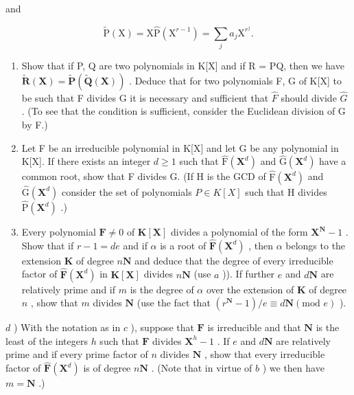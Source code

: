 and

\[
\tilde {\mathrm{P}} (\mathrm{X}) = \mathrm{X} \hat {\mathrm{P}} \left(\mathrm{X} ^ {r - 1}\right) = \sum_ {j} a _ {j} \mathrm{X} ^ {r ^ {j}}.
\]

\begin{enumerate}
\def\labelenumi{\alph{enumi})}
\item
  Show that if P, Q are two polynomials in K{[}X{]} and if R = PQ, then we have \(\tilde{\mathbf{R}}(\mathbf{X}) = \tilde{\mathbf{P}}(\tilde{\mathbf{Q}}(\mathbf{X}))\) . Deduce that for two polynomials F, G of K{[}X{]} to be such that F divides G it is necessary and sufficient that \(\hat{F}\) should divide \(\hat{G}\) . (To see that the condition is sufficient, consider the Euclidean division of G by F.)
\item
  Let F be an irreducible polynomial in K{[}X{]} and let G be any polynomial in K{[}X{]}. If there exists an integer \(d \geqslant 1\) such that \(\hat{\mathrm{F}}(\mathbf{X}^{d})\) and \(\hat{\mathrm{G}}(\mathbf{X}^{d})\) have a common root, show that F divides G. (If H is the GCD of \(\hat{\mathrm{F}}(\mathbf{X}^{d})\) and \(\hat{\mathrm{G}}(\mathbf{X}^{d})\) consider the set of polynomials \(P \in K[X]\) such that H divides \(\hat{\mathrm{P}}(\mathbf{X}^{d})\) .)
\item
  Every polynomial \(\mathbf{F} \neq 0\) of \(\mathbf{K}[\mathbf{X}]\) divides a polynomial of the form \(\mathbf{X}^{\mathbf{N}} - 1\) . Show that if \(r - 1 = de\) and if \(\alpha\) is a root of \(\hat{\mathbf{F}}(\mathbf{X}^{d})\) , then \(\alpha\) belongs to the extension \(\mathbf{K}\) of degree \(n\mathbf{N}\) and deduce that the degree of every irreducible factor of \(\hat{\mathbf{F}}(\mathbf{X}^d)\) in \(\mathbf{K}[\mathbf{X}]\) divides \(n\mathbf{N}\) (use \(a\) )). If further \(e\) and \(d\mathbf{N}\) are relatively prime and if \(m\) is the degree of \(\alpha\) over the extension of \(\mathbf{K}\) of degree \(n\) , show that \(m\) divides \(\mathbf{N}\) (use the fact that \((r^{\mathbf{N}} - 1)/e \equiv d\mathbf{N} (\text{mod } e)\) ).
\end{enumerate}

\(d\) ) With the notation as in \(c\) ), suppose that \(\mathbf{F}\) is irreducible and that \(\mathbf{N}\) is the least of the integers \(h\) such that \(\mathbf{F}\) divides \(\mathbf{X}^h - 1\) . If \(e\) and \(d\mathbf{N}\) are relatively prime and if every prime factor of \(n\) divides \(\mathbf{N}\) , show that every irreducible factor of \(\hat{\mathbf{F}}(\mathbf{X}^d)\) is of degree \(n\mathbf{N}\) . (Note that in virtue of \(b\) ) we then have \(m = \mathbf{N}\) .)

